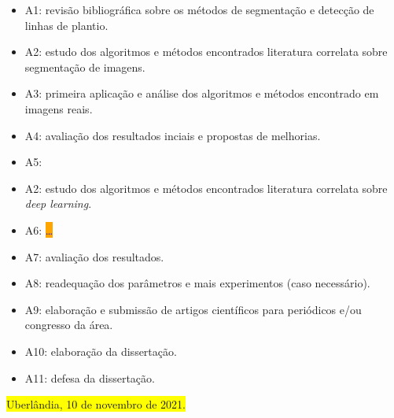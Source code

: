 \documentclass[12pt, a4paper, english, brazil]{article}
\newcommand{\dotsBlue}{\colorbox{orange}{\textcolor{blue}{\dots}}}
\newcommand{\boxYellow}[1]{\colorbox{yellow}{#1}}
\begin{document}
\begin{itemize}
    \item A1: revisão bibliográfica sobre os métodos de segmentação e detecção de linhas de plantio.
    \item A2: estudo dos algoritmos e métodos encontrados literatura correlata sobre segmentação de imagens.
    \item A3: primeira aplicação e análise dos algoritmos e métodos encontrado em imagens reais.
    \item A4: avaliação dos resultados inciais e propostas de melhorias.
    \item A5: \item A2: estudo dos algoritmos e métodos encontrados literatura correlata sobre \textit{deep learning}.
    \item A6: \dotsBlue
    \item A7: avaliação dos resultados.
    \item A8: readequação dos parâmetros e mais experimentos (caso necessário).
    \item A9: elaboração e submissão de artigos científicos para periódicos e/ou congresso da área.
    \item A10: elaboração da dissertação.
    \item A11: defesa da dissertação.
\end{itemize}



\bigskip
\noindent \boxYellow{Uberlândia, 10 de novembro de 2021.}


\end{document}
